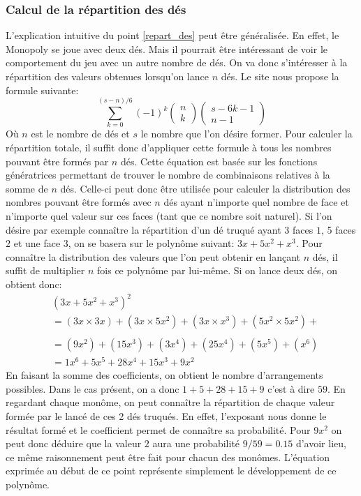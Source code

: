 \documentclass[letterpaper]{article}
\begin{document}
    \subsubsection{Calcul de la répartition des dés}
      L'explication intuitive du point \ref{repart_des} peut être généralisée.
      En effet, le Monopoly se joue avec deux dés.  Mais il pourrait être
      intéressant de voir le comportement du jeu avec un autre nombre de dés.
      On va donc s'intéresser à la répartition des valeurs obtenues lorsqu'on 
      lance $n$ dés.  Le site \cite{FORMULE_Des} nous propose la formule 
      suivante:
      $$\sum\limits_{k=0}^{(s-n)/6} (-1)^k \begin{pmatrix}n \\ k\end{pmatrix} 
	\begin{pmatrix}s-6k-1 \\n-1\end{pmatrix}$$
      Où $n$ est le nombre de dés et $s$ le nombre que l'on désire former.
      Pour calculer la répartition totale, il suffit donc d'appliquer cette
      formule à tous les nombres pouvant être formés par $n$ dés.
      Cette équation est basée sur les fonctions génératrices permettant de
      trouver le nombre de combinaisons relatives à la somme de $n$ dés.
      Celle-ci peut donc être utilisée pour calculer la distribution
      des nombres pouvant être formés avec $n$ dés ayant n'importe quel 
      nombre de face et n'importe quel valeur sur ces faces (tant que ce 
      nombre soit naturel).
      Si l'on désire par exemple connaître la répartition d'un dé truqué 
      ayant 3 faces $1$, 5 faces $2$ et une face $3$, on se basera sur le 
      polynôme suivant: $3x + 5x^2 + x^3$.  Pour connaître la distribution 
      des valeurs que l'on peut obtenir en lançant $n$ dés, il suffit de 
      multiplier $n$ fois ce polynôme par lui-même.  Si on lance deux dés,
      on obtient donc:
      \begin{align*}
      &(3x + 5x^2 + x^3)^2\\
      &= (3x \times 3x) + (3x \times 5x^2) + (3x \times x^3) + (5x^2 \times 5x^2) + \\
      \tag*{$(5x^2 \times x^3) + (x^3 \times x^3)$}\\
      &= (9x^2) + (15x^3) + (3x^4) + (25x^4) + (5x^5) + (x^6)\\
      &= 1 x^6 + 5x^5 + 28x^4 + 15x^3 + 9x^2
      \end{align*}
      En faisant la somme des coefficients, on obtient le nombre d'arrangements 
      possibles.  Dans le cas présent, on a donc $1 + 5 + 28 + 15 + 9$ c'est à 
      dire $59$.  En regardant chaque monôme, on peut connaître la répartition
      de chaque valeur formée par le lancé de ces 2 dés truqués.  En effet, 
      l'exposant nous donne le résultat formé et le coefficient permet de 
      connaître sa probabilité.  Pour $9 x^2$ on peut donc déduire que la 
      valeur $2$ aura une probabilité $9/59 = 0.15$ d'avoir lieu, ce même
      raisonnement peut être fait pour chacun des monômes.
      L'équation exprimée au début de ce point représente simplement le 
      développement de ce polynôme.
    
\end{document}
